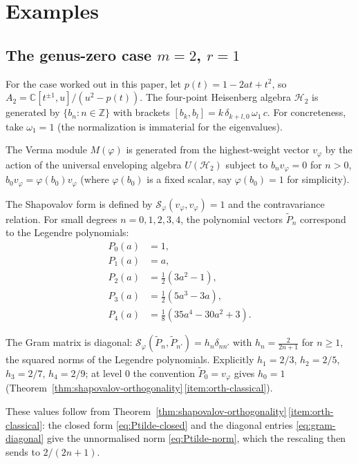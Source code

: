 \documentclass[12pt]{amsart}
\theoremstyle{plain}
\theoremstyle{definition}
\newcommand{\CC}{\mathbb{C}}
\newcommand{\ZZ}{\mathbb{Z}}
\newcommand{\Mf}{M(\varphi)}          %
\newcommand{\Sf}{\mathcal{S}_\varphi} %
\newcommand{\vf}{v_\varphi}           %
\begin{document}
\section{Examples}
\label{sec:examples}

\subsection{The genus-zero case $m = 2$, $r = 1$}
\label{subsec:example-m2}

For the case worked out in this paper, let $p(t) = 1 - 2at + t^2$, so $A_2 = \CC[t^{\pm 1}, u] / (u^2 - p(t))$.
The four-point Heisenberg algebra $\mathcal{H}_2$ is generated by
$\{b_n : n \in \ZZ\}$ with brackets $[b_k, b_l] = k\,\delta_{k+l,0}\,\omega_1\,c$.
For concreteness, take $\omega_1 = 1$ (the normalization is immaterial for the eigenvalues).

The Verma module $\Mf$ is generated from the highest-weight vector $\vf$
by the action of the universal enveloping algebra $U(\mathcal{H}_2)$ subject to
$b_n \vf = 0$ for $n > 0$, $b_0 \vf = \varphi(b_0) \vf$ (where $\varphi(b_0)$ is a
fixed scalar, say $\varphi(b_0) = 1$ for simplicity).

The Shapovalov form is defined by $\Sf(\vf, \vf) = 1$ and the contravariance relation.
For small degrees $n = 0, 1, 2, 3, 4$, the polynomial vectors $\tilde{P}_n$ correspond
to the Legendre polynomials:
\[
  \begin{aligned}
  P_0(a) &= 1, \\
  P_1(a) &= a, \\
  P_2(a) &= \frac{1}{2}(3a^2 - 1), \\
  P_3(a) &= \frac{1}{2}(5a^3 - 3a), \\
  P_4(a) &= \frac{1}{8}(35a^4 - 30a^2 + 3).
  \end{aligned}
\]

The Gram matrix is diagonal: $\Sf(\tilde{P}_n, \tilde{P}_{n'}) = h_n \delta_{n n'}$
with $h_n = \frac{2}{2n+1}$ for $n \geq 1$, the squared norms of the
Legendre polynomials. Explicitly $h_1 = 2/3$, $h_2 = 2/5$, $h_3 = 2/7$,
$h_4 = 2/9$; at level $0$ the convention $\tilde{P}_0 = \vf$ gives
$h_0 = 1$ (Theorem~\ref{thm:shapovalov-orthogonality}\,\ref{item:orth-classical}).

These values follow from
Theorem~\ref{thm:shapovalov-orthogonality}\,\ref{item:orth-classical}:
the closed form \eqref{eq:Ptilde-closed} and the diagonal entries
\eqref{eq:gram-diagonal} give the unnormalised norm
\eqref{eq:Ptilde-norm}, which the rescaling then sends to
$2/(2n+1)$.
\end{document}

